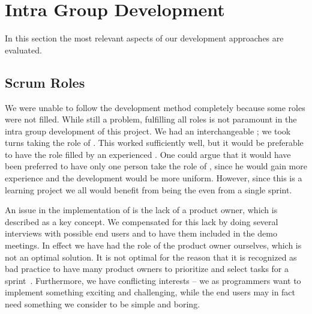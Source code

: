 \section{Intra Group Development}
\label{sec:intragroupdev}

In this section the most relevant aspects of our development approaches are evaluated.

\subsection{Scrum Roles}
We were unable to follow the \scrum{} development method completely because some roles were not filled.
While still a problem, fulfilling all roles is not paramount in the intra group development of this project.
We had an interchangeable \scrummaster{}; we took turns taking the role of \scrummaster{}.
This worked sufficiently well, but it would be preferable to have the role filled by an experienced \scrummaster{}.
One could argue that it would have been preferred to have only one person take the role of \scrummaster{}, since he would gain more experience and the development would be more uniform.
However, since this is a learning project we all would benefit from being the \scrummaster{} even from a single sprint.

An issue in the implementation of \sos{} is the lack of a product owner, which is described as a key concept. 
We compensated for this lack by doing several interviews with possible end users and to have them included in the demo meetings. 
In effect we have had the role of the product owner ourselves, which is not an optimal solution. 
It is not optimal for the reason that it is recognized as bad \scrum{} practice to have many product owners to prioritize and select tasks for a sprint~\cite[p.~128]{Larman04}. 
Furthermore, we have conflicting interests -- we as programmers want to implement something exciting and challenging, while the end users may in fact need something we consider to be simple and boring.



